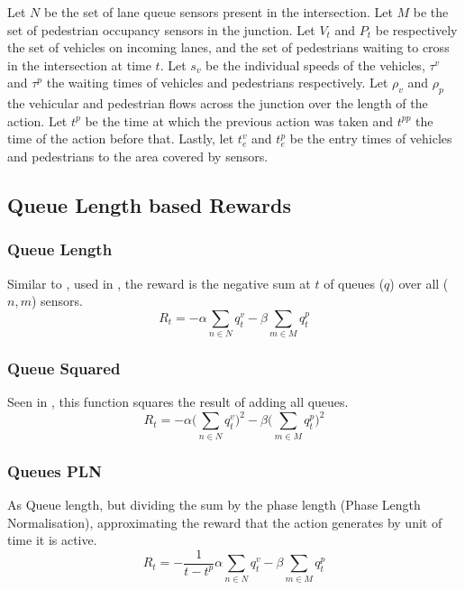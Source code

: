 \documentclass[conference]{IEEEtran}
\begin{document}
Let $N$ be the set of lane queue sensors present in the intersection.
Let $M$ be the set of pedestrian occupancy sensors in the junction.
Let $V_t$ and $P_t$ be respectively the set of vehicles on incoming lanes, and the set of pedestrians waiting to cross in the intersection at time $t$. 
Let $s_v$ be the individual speeds of the vehicles, $\tau^v$ and $\tau^p$ the waiting times of vehicles and pedestrians respectively.
Let $\rho_v$ and $\rho_p$ the vehicular and pedestrian flows across the junction over the length of the action.
Let $t^p$ be the time at which the previous action was taken and $t^{pp}$ the time of the action before that.
Lastly, let $t^v_e$ and $t^p_e$ be the entry times of vehicles and pedestrians to the area covered by sensors. 

\subsection{Queue Length based Rewards}
\subsubsection{Queue Length}
Similar to \cite{pra2010}, used in \cite{aslani2019}, the reward is the negative sum at $t$ of queues ($q$) over all ($n,m$) sensors.
\begin{equation}
    R_t = - \alpha \sum_{n \in N} q^v_{t} - \beta \sum_{m \in M} q^p_{t}
\label{eq:queue}
\end{equation}

\subsubsection{Queue Squared}
Seen in \cite{gendersthesis}, this function squares the result of adding all queues.
\begin{equation}
   R_t = - \alpha \bigg( \sum_{n \in N} q^v_{t} \bigg)^2 - \beta \bigg( \sum_{m \in M} q^p_{t} \bigg)^2
\label{eq:queuesq} 
\end{equation}

\subsubsection{Queues PLN}
As Queue length, but dividing the sum by the phase length (Phase Length Normalisation), approximating the reward that the action generates by unit of time it is active.
\begin{equation}
    R_t = - \frac{1}{t-t^p} \alpha \sum_{n \in N} q^v_{t} - \beta \sum_{m \in M} q^p_{t}
    \label{queuepln}
\end{equation}
\end{document}
